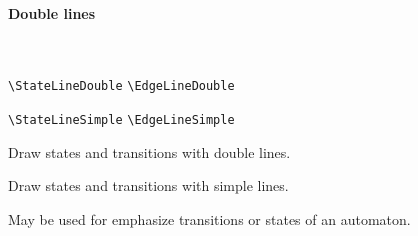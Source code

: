 \documentclass[11pt,twoside]{article}
\newlength{\ColoText}%
\newlength{\ColoFigu}%
\newlength{\parindenttemp} %
\newcommand{\noi}{\noindent}
\newcommand{\ee}{\text{\qquad}}               %
\newlength{\jsIndent}%
\begin{document}
\paragraph{Double lines}
~

\noi 
\hspace*{-\jsIndent}
\begin{minipage}[t]{\ColoText}
        \par\vspace*{0mm}%
        \footnotesize
\verb+\StateLineDouble+ \ee \verb+\EdgeLineDouble+ 
   
\medskip 
\verb+\StateLineSimple+ \ee \verb+\EdgeLineSimple+ 
   
\end{minipage}%
\hspace*{1.2em}%
\begin{minipage}[t]{\ColoFigu}%
\par\vspace*{0mm}%
Draw states and transitions with double lines.

\smallskip 

Draw states and transitions with simple lines.
\end{minipage}%

\medskip
\noi 
May be used for emphasize transitions or states 
of an automaton.
\end{document}
